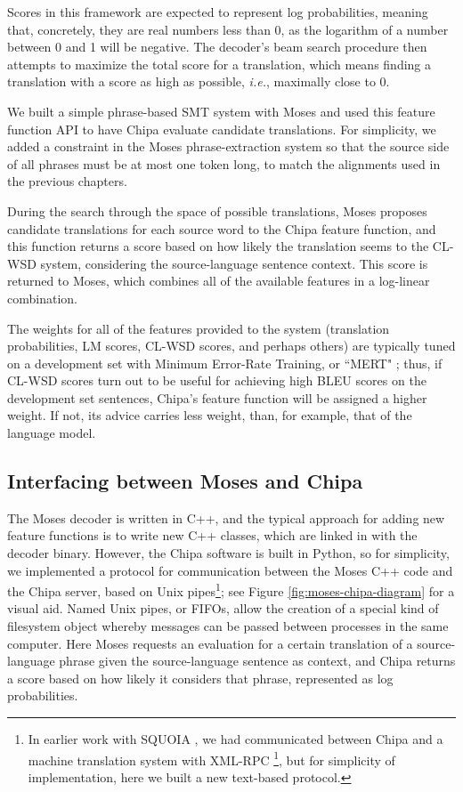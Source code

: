 Scores in this framework are expected to represent log probabilities, meaning
that, concretely, they are real numbers less than 0, as the logarithm of a
number between 0 and 1 will be negative. The decoder's beam search procedure
then attempts to maximize the total score for a translation, which means
finding a translation with a score as high as possible, \emph{i.e.}, maximally
close to 0.

We built a simple phrase-based SMT system with Moses and used this feature
function API to have Chipa evaluate candidate translations. For simplicity, we
added a constraint in the Moses phrase-extraction system so that the source
side of all phrases must be at most one token long, to match the alignments
used in the previous chapters.

During the search through the space of possible translations, Moses proposes
candidate translations for each source word to the Chipa feature function, and
this function returns a score based on how likely the translation seems to the
CL-WSD system, considering the source-language sentence context. This score is
returned to Moses, which combines all of the available features in a log-linear
combination.

The weights for all of the features provided to the system (translation
probabilities, LM scores, CL-WSD scores, and perhaps others) are typically
tuned on a development set with Minimum Error-Rate Training, or ``MERT"
\cite{och:2003:ACL} ; thus, if CL-WSD scores turn out to be useful for
achieving high BLEU scores on the development set sentences, Chipa's feature
function will be assigned a higher weight. If not, its advice carries less
weight, than, for example, that of the language model.

\subsection{Interfacing between Moses and Chipa}
The Moses decoder is written in C++, and the typical approach for adding new
feature functions is to write new C++ classes, which are linked in with the
decoder binary. However, the Chipa software is built in Python, so for
simplicity, we implemented a protocol for communication between the Moses C++
code and the Chipa server, based on Unix pipes\footnote{In earlier work with
SQUOIA \cite{rudnick:saltmil2014}, we had communicated between Chipa and a
machine translation system with XML-RPC
\footnote{\url{http://xmlrpc.scripting.com/}}, but for simplicity of
implementation, here we built a new text-based protocol.}; see Figure
\ref{fig:moses-chipa-diagram} for a visual aid.  Named Unix pipes, or FIFOs,
allow the creation of a special kind of filesystem object whereby messages can
be passed between processes in the same computer. Here Moses requests an
evaluation for a certain translation of a source-language phrase given the
source-language sentence as context, and Chipa returns a score based on how
likely it considers that phrase, represented as log probabilities.

